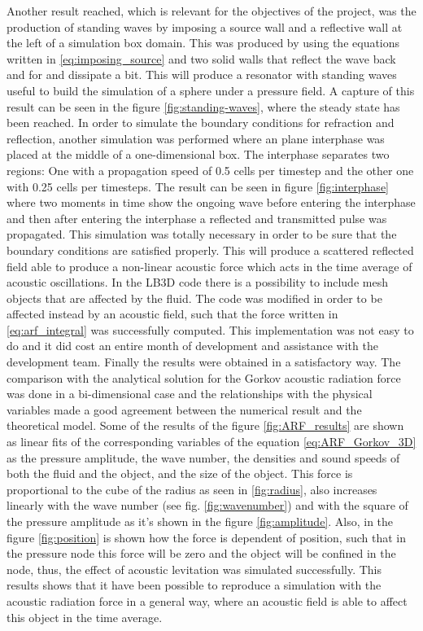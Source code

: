 Another result reached, which is relevant for the objectives of the project, was the production of standing waves by imposing a source wall and a reflective wall at the left of a simulation box domain. This was produced by using the equations written in \ref{eq:imposing_source} and two solid walls that reflect the wave back and for and dissipate a bit. This will produce a resonator with standing waves useful to build the simulation of a sphere under a pressure field. A capture of this result can be seen in the figure \ref{fig:standing-waves},  where the steady state has been reached. In order to simulate the boundary conditions for refraction and reflection, another simulation was performed where an plane interphase was placed at the middle of a one-dimensional box. The interphase separates two regions: One with a propagation speed of 0.5 cells per timestep and the other one with 0.25 cells per timesteps. The result can be seen in figure \ref{fig:interphase} where two moments in time show the ongoing wave before entering the interphase and then after entering the interphase a reflected and transmitted pulse was propagated.
This simulation was totally necessary in order to be sure that the boundary conditions are satisfied properly. This will produce a scattered reflected field able to produce a non-linear acoustic force which acts in the time average of acoustic oscillations. In the LB3D code there is a possibility to include mesh objects that are affected by the fluid. The code was modified in order to be affected instead by an acoustic field, such that the force written in \ref{eq:arf_integral} was successfully computed. This implementation was not easy to do and it did cost an entire month of development and assistance with the development team. Finally the results were obtained in a satisfactory way. The comparison with the analytical solution for the Gorkov acoustic radiation force was done in a bi-dimensional case and the relationships with the physical variables made a good agreement between the numerical result and the theoretical model. Some of the results of the figure \ref{fig:ARF_results} are shown as linear fits of the corresponding variables of the equation \ref{eq:ARF_Gorkov_3D} as the pressure amplitude, the wave number, the densities and sound speeds of both the fluid and the object, and the size of the object. This force is proportional to the cube of the radius as seen in \ref{fig:radius}, also increases linearly with the wave number (see fig. \ref{fig:wavenumber}) and with the square of the pressure amplitude as it's shown in the figure \ref{fig:amplitude}. Also, in the figure \ref{fig:position} is shown how the force is dependent of position, such that in the pressure node this force will be zero and the object will be confined in the node, thus, the effect of acoustic levitation was simulated successfully. This results shows that it have been possible to reproduce a simulation with the acoustic radiation force in a general way, where an acoustic field is able to affect this object in the time average. 

